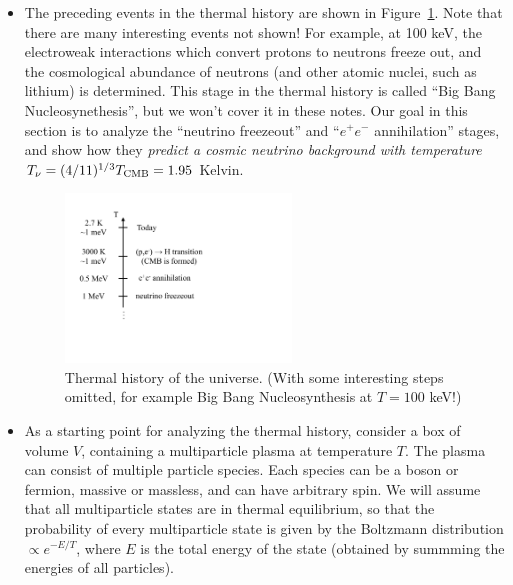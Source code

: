 \documentclass[aps,prd,superscriptaddress,groupedaddress,nofootinbib,nobibnotes]{revtex4}
\begin{document}
\begin{itemize}
\item
The preceding events in the thermal history are shown in Figure~\ref{fig:thermal_history}.
Note that there are many interesting events not shown!
For example, at 100 keV, the electroweak interactions which convert protons to neutrons freeze out,
and the cosmological abundance of neutrons (and other atomic nuclei, such as lithium) is determined.
This stage in the thermal history is called ``Big Bang Nucleosynethesis'', but we won't cover it in these notes.
Our goal in this section is to analyze the ``neutrino freezeout'' and ``$e^+e^-$ annihilation'' stages,
and show how they {\em predict a cosmic neutrino background with temperature} $T_\nu = (4/11)^{1/3} T_{\rm CMB} = 1.95$ Kelvin.

\begin{figure}[h!]
\centerline{\includegraphics[trim={0 6cm 12cm 2cm},clip,width=6cm]{figs/thermal_history.pdf}}
\caption{Thermal history of the universe.  (With some interesting steps omitted, for example Big Bang Nucleosynthesis at $T=100$ keV!)}
\label{fig:thermal_history}
\end{figure}

\item
As a starting point for analyzing the thermal history,
consider a box of volume $V$, containing a multiparticle plasma at temperature $T$.
The plasma can consist of multiple particle species.
Each species can be a boson or fermion, massive or massless, and can have arbitrary spin.
We will assume that all multiparticle states are in thermal equilibrium, so that the probability
of every multiparticle state is given by the Boltzmann distribution $\propto e^{-E/T}$, where
$E$ is the total energy of the state (obtained by summming the energies of all particles).


\end{itemize}
\end{document}

